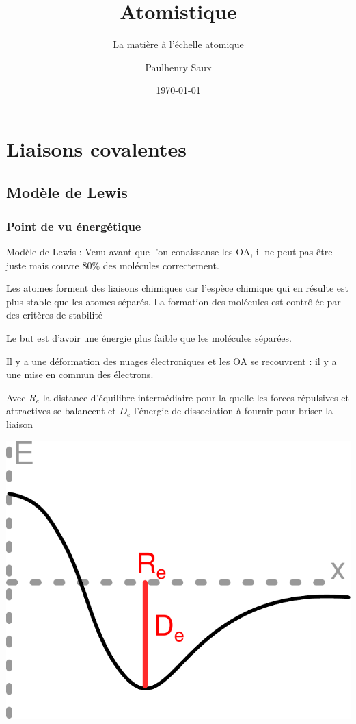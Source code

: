 \documentclass[french]{yLectureNote}
\title{Atomistique}
\subtitle{La matière à l'échelle atomique}
\author{Paulhenry Saux}
\date{\today}
\begin{document}
\setcounter{chapter}{2}
\chapter{Liaisons covalentes}
\section{Modèle de Lewis}
\subsection{Point de vu énergétique}
Modèle de Lewis : Venu avant que l'on conaissanse les OA, il ne peut pas \^etre juste mais couvre 80\% des molécules correctement.

Les atomes forment des liaisons chimiques car l'espèce chimique qui en résulte est plus stable que les atomes séparés. La formation des molécules est contrôlée par des critères de stabilité

Le but est d'avoir une énergie plus faible que les molécules séparées.

Il y a une déformation des nuages électroniques et les OA se recouvrent : il y a une mise en commun des électrons.

Avec $R_e$ la distance d’équilibre intermédiaire pour la quelle les forces
répulsives et attractives se balancent et $D_e$ l'énergie de dissociation à fournir pour briser la liaison

\includegraphics[scale=0.45]{schema1}
\end{document}
